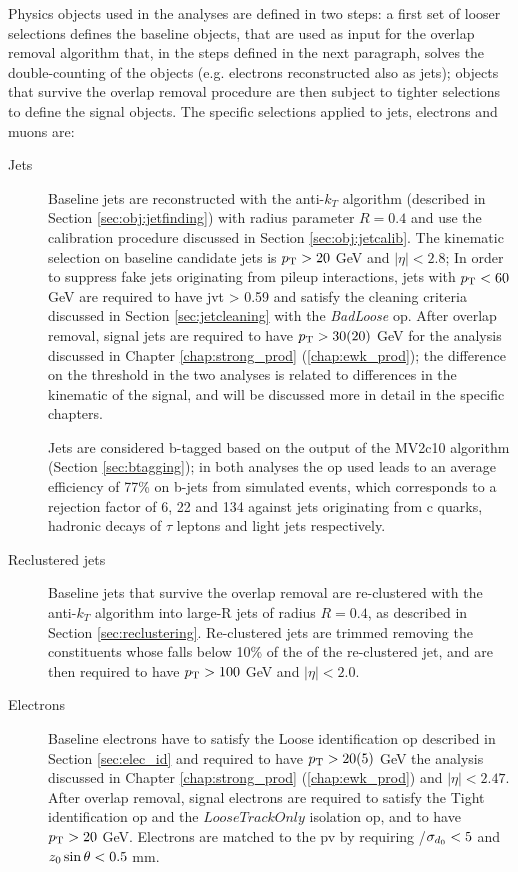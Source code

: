 Physics objects used in the analyses are defined in two steps:
a first set of looser selections defines the baseline objects, that are used as input for the overlap removal algorithm that, in the steps defined in the next paragraph,
solves the double-counting of the objects (e.g. electrons reconstructed also as jets); objects that survive the overlap removal procedure are then subject to 
tighter selections to define the signal objects. The specific selections applied to jets, electrons and muons are:

\begin{description}

\item[Jets] Baseline jets are reconstructed with the anti-$k_T$ algorithm (described in Section \ref{sec:obj:jetfinding}) with radius parameter $R=0.4$ 
and use the calibration procedure discussed in Section \ref{sec:obj:jetcalib}. 
The kinematic selection on baseline candidate jets is  $p_{\rm T} > 20$ GeV and $|\eta|<2.8$; 
In order to suppress fake jets originating from pileup interactions, jets with $p_{\rm T}<60$ GeV are required to have \gls{jvt} > 0.59 and satisfy the cleaning criteria discussed in Section \ref{sec:jetcleaning} with the \textit{BadLoose} \gls{op}.
After overlap removal, signal jets are required to have $p_{\rm T}>30 (20)$ GeV for the analysis discussed in Chapter \ref{chap:strong_prod} (\ref{chap:ewk_prod}); the difference on the \pt threshold 
in the two analyses is related to differences in the kinematic of the signal, and will be discussed more in detail in the specific chapters.

Jets are considered b-tagged based on the output of the MV2c10 algorithm (Section \ref{sec:btagging}); in both analyses the \gls{op} used leads to an average efficiency of 77\% on b-jets from simulated  
\ttbar events, which corresponds to a rejection factor of 6, 22 and 134 against jets originating from c quarks, hadronic decays of $\tau$ leptons and light jets respectively. 


\item[Reclustered jets] Baseline jets that survive the overlap removal are re-clustered with the anti-$k_T$ algorithm into large-R jets of radius $R=0.4$, as described in Section \ref{sec:reclustering}. 
Re-clustered jets are trimmed removing the constituents whose \pt falls below 10\% of the \pt of the re-clustered jet, and are then required to have $p_{\rm T}>100$ GeV and $|\eta|<2.0$.

\item[Electrons] Baseline electrons have to satisfy the Loose identification \gls{op} described in Section \ref{sec:elec_id} and required to have $p_{\rm T} > 20 (5)$ GeV the analysis discussed in Chapter \ref{chap:strong_prod} (\ref{chap:ewk_prod}) and $|\eta|<2.47$. 
After overlap removal, signal electrons are required to satisfy the Tight identification \gls{op} and the $LooseTrackOnly$ isolation \gls{op}, and  to have $p_{\rm T} > 20$ GeV.
Electrons are matched to the \gls{pv} by requiring \dzero/$\sigma_{d_0} < 5$ and  ${z_0} \sin\theta < 0.5$ mm.



\end{description}
